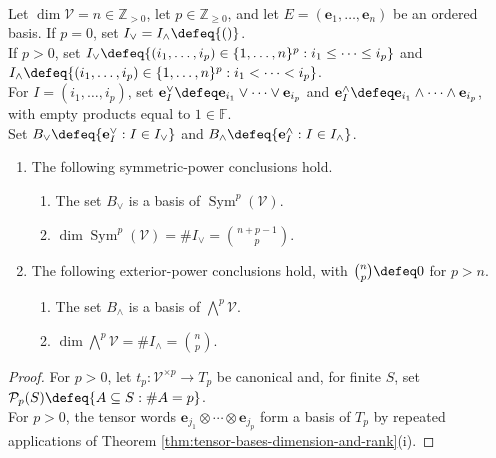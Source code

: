 \begin{theorem} \label{thm:symmetric-exterior-dimensions} \\
Let $\dim\mathcal{V}=n\in\mathbb{Z}_{>0}$, let $p\in\mathbb{Z}_{\geq0}$, and let $E=(\mathbf{e}_1,\ldots,\mathbf{e}_n)$ be an ordered basis. If $p=0$, set $I_{\vee}=I_{\wedge}\defeq\{()\}$.\\
If $p>0$, set $I_{\vee}\defeq\{(i_1,\ldots,i_p)\in\{1,\ldots,n\}^{p}:i_1\leq\cdots\leq i_p\}$ and $I_{\wedge}\defeq\{(i_1,\ldots,i_p)\in\{1,\ldots,n\}^{p}:i_1<\cdots<i_p\}$.\\
For $I=(i_1,\ldots,i_p)$, set $\mathbf{e}_{I}^{\vee}\defeq\mathbf{e}_{i_1}\vee\cdots\vee\mathbf{e}_{i_p}$ and $\mathbf{e}_{I}^{\wedge}\defeq\mathbf{e}_{i_1}\wedge\cdots\wedge\mathbf{e}_{i_p}$, with empty products equal to $1\in\mathbb{F}$.\\
Set $B_{\vee}\defeq\{\mathbf{e}_{I}^{\vee}:I\in I_{\vee}\}$ and $B_{\wedge}\defeq\{\mathbf{e}_{I}^{\wedge}:I\in I_{\wedge}\}$.
\begin{enumerate}[label=(\roman*)]
\setlength{\itemsep}{0pt}
\item The following symmetric-power conclusions hold.
\begin{enumerate}[label=(\alph*)]
\setlength{\itemsep}{0pt}
\item The set $B_{\vee}$ is a basis of $\operatorname{Sym}^{p}(\mathcal{V})$.
\item $\dim\operatorname{Sym}^{p}(\mathcal{V})=\#I_{\vee}=\binom{n+p-1}{p}$.
\end{enumerate}
\item The following exterior-power conclusions hold, with $\binom{n}{p}\defeq0$ for $p>n$.
\begin{enumerate}[label=(\alph*)]
\setlength{\itemsep}{0pt}
\item The set $B_{\wedge}$ is a basis of $\bigwedge^{p}\mathcal{V}$.
\item $\dim\bigwedge^{p}\mathcal{V}=\#I_{\wedge}=\binom{n}{p}$.
\end{enumerate}
\end{enumerate}
\begin{proof}
For $p>0$, let $t_p:\mathcal{V}^{\times p}\to T_p$ be canonical and, for finite $S$, set $\mathcal{P}_p(S)\defeq\{A\subseteq S:\#A=p\}$.\\
For $p>0$, the tensor words $\mathbf{e}_{j_1}\otimes\cdots\otimes\mathbf{e}_{j_p}$ form a basis of $T_p$ by repeated applications of Theorem \ref{thm:tensor-bases-dimension-and-rank}(i).

\end{proof}
\end{theorem}
